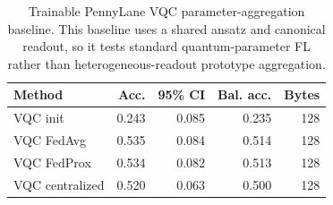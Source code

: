 \begin{table}[t]
\centering
\caption{Trainable PennyLane VQC parameter-aggregation baseline. This baseline uses a shared ansatz and canonical readout, so it tests standard quantum-parameter FL rather than heterogeneous-readout prototype aggregation.}
\label{tab:quantum-param-vqc}
\begin{tabular}{lrrrr}
\toprule
Method & Acc. & 95\% CI & Bal. acc. & Bytes \\
\midrule
VQC init & 0.243 & 0.085 & 0.235 & 128 \\
VQC FedAvg & 0.535 & 0.084 & 0.514 & 128 \\
VQC FedProx & 0.534 & 0.082 & 0.513 & 128 \\
VQC centralized & 0.520 & 0.063 & 0.500 & 128 \\
\bottomrule
\end{tabular}
\end{table}
